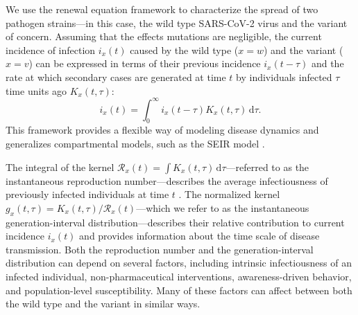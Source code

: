 \documentclass[12pt]{article}
\newcommand{\RR}{\ensuremath{{\mathcal R}}\xspace}
\newcommand{\dd}[1]{\ensuremath{\, \mathrm{d}#1}}
\newcommand{\dtau}{\dd{\tau}}
\begin{document}
We use the renewal equation framework to characterize the spread of two pathogen strains---in this case, the wild type SARS-CoV-2 virus and the variant of concern.
Assuming that the effects mutations are negligible, the current incidence of infection $i_x(t)$ caused by the wild type ($x=w$) and the variant ($x=v$) can be expressed in terms of their previous incidence $i_x(t-\tau)$ and the rate at which secondary cases are generated at time $t$ by individuals infected $\tau$ time units ago $K_x(t, \tau)$:
\begin{equation}
i_x(t) = \int_0^\infty i_x(t-\tau) K_x(t, \tau) \dtau.
\end{equation}
This framework provides a flexible way of modeling disease dynamics and generalizes compartmental models, such as the SEIR model \citep{heesterbeek1996concept, diekmann2000mathematical, roberts2004modelling, aldis2005integral, roberts2007model, champredon2018equivalence}.

The integral of the kernel $\RR_x(t) = \int K_x(t, \tau) \dtau$---referred to as the instantaneous reproduction number---describes the average infectiousness of previously infected individuals at time $t$ \citep{fraser2007estimating}.
The normalized kernel $g_x(t, \tau) = K_x(t, \tau)/\RR_x(t)$---which we refer to as the instantaneous generation-interval distribution---describes their relative contribution to current incidence $i_x(t)$ and provides information about the time scale of disease transmission.
Both the reproduction number and the generation-interval distribution can depend on several factors, including intrinsic infectiousness of an infected individual, non-pharmaceutical interventions, awareness-driven behavior, and population-level susceptibility.
Many of these factors can affect between both the wild type and the variant in similar ways.
\end{document}
